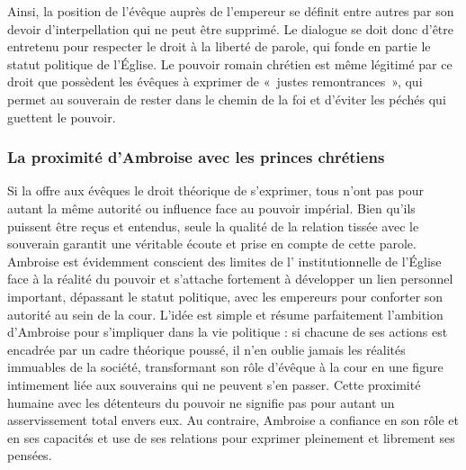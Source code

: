 \bigskip

Ainsi, la position de l'évêque auprès de l'empereur se définit entre autres par son devoir d'interpellation qui ne peut être supprimé. Le dialogue se doit donc d'être entretenu pour respecter le droit à la liberté de parole, qui fonde en partie le statut politique de l'Église. Le pouvoir romain chrétien est même légitimé par ce droit que possèdent les évêques à exprimer de «~justes remontrances~», qui permet au souverain de rester dans le chemin de la foi et d'éviter les péchés qui guettent le pouvoir.

\bigskip

\subsubsection{La proximité d'Ambroise avec les princes chrétiens}

Si la  offre aux évêques le droit théorique de s'exprimer, tous n'ont pas pour autant la même autorité ou influence face au pouvoir impérial. Bien qu'ils puissent être reçus et entendus, seule la qualité de la relation tissée avec le souverain garantit une véritable écoute et prise en compte de cette parole. Ambroise est évidemment conscient des limites de l' institutionnelle de l'Église face à la réalité du pouvoir et s'attache fortement à développer un lien personnel important, dépassant le statut politique, avec les empereurs pour conforter son autorité au sein de la cour. L'idée est simple et résume parfaitement l'ambition d'Ambroise pour s'impliquer dans la vie politique : si chacune de ses actions est encadrée par un cadre théorique poussé, il n'en oublie jamais les réalités immuables de la société, transformant son rôle d'évêque à la cour en une figure intimement liée aux souverains qui ne peuvent s'en passer. Cette proximité humaine avec les détenteurs du pouvoir ne signifie pas pour autant un asservissement total envers eux. Au contraire, Ambroise a confiance en son rôle et en ses capacités et use de ses relations pour exprimer pleinement et librement ses pensées.

\bigskip

